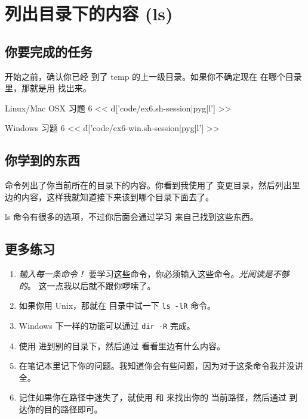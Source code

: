 \chapter{列出目录下的内容 (ls)}

\section{你要完成的任务}

开始之前，确认你已经  到了 temp 的上一级目录。如果你不确定现在
在哪个目录里，那就是用  找出来。

\begin{code}{Linux/Mac OSX 习题 6}
<< d['code/ex6.sh-session|pyg|l'] >>
\end{code}

\begin{code}{Windows 习题 6}
<< d['code/ex6-win.sh-session|pyg|l'] >>
\end{code}

\section{你学到的东西}

 命令列出了你当前所在的目录下的内容。你看到我使用了 
变更目录，然后列出里边的内容，这样我就知道接下来该到哪个目录下面去了。

ls 命令有很多的选项，不过你后面会通过学习  来自己找到这些东西。

\section{更多练习}

\begin{enumerate}
\item \emph{输入每一条命令！} 要学习这些命令，你必须输入这些命令。\emph{光阅读是不够的}。
    这一点我以后就不跟你啰嗦了。
\item 如果你用 Unix，那就在  目录中试一下 \verb|ls -lR| 命令。
\item Windows 下一样的功能可以通过 \verb|dir -R| 完成。
\item 使用  进到别的目录下，然后通过  看看里边有什么内容。
\item 在笔记本里记下你的问题。我知道你会有些问题，因为对于这条命令我并没讲全。
\item 记住如果你在路径中迷失了，就使用  和  来找出你的
    当前路径，然后通过  到达你的目的路径即可。
\end{enumerate}

